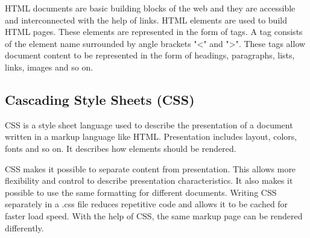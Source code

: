 HTML documents are basic building blocks of the web and they are accessible and interconnected with the help of links. HTML elements are used to build HTML pages. These elements are represented in the form of tags. A tag consists of the element name surrounded by angle brackets "\textless" and "\textgreater". These tags allow document content to be represented in the form of headings, paragraphs, lists, links, images and so on. 

\subsection{Cascading Style Sheets (CSS)}
CSS is a style sheet language used to describe the presentation of a document written in a markup language like HTML. Presentation includes layout, colors, fonts and so on. It describes how elements should be rendered. \newline

CSS makes it possible to separate content from presentation. This allows more flexibility and control to describe presentation characteristics. It also makes it possible to use the same formatting for different documents. Writing CSS separately in a .css file reduces repetitive code and allows it to be cached for faster load speed.  With the help of CSS, the same markup page can be rendered differently.


